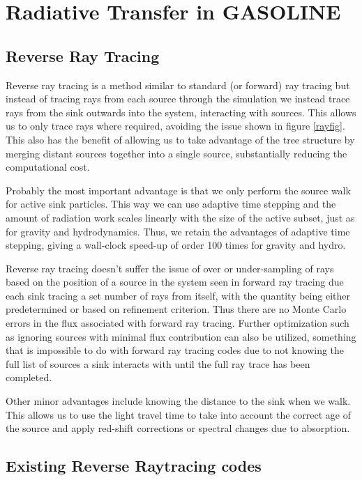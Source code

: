 \chapter{Radiative Transfer in GASOLINE}

\section{Reverse Ray Tracing}

Reverse ray tracing is a method similar to standard (or forward) ray tracing but instead of tracing rays from each source through the simulation we instead trace rays from the sink outwards into the system, interacting with sources. This allows us to only trace rays where required, avoiding the issue shown in figure \ref{rayfig}. This also has the benefit of allowing us to take advantage of the tree structure by merging distant sources together into a single source, substantially reducing the computational cost. 

Probably the most important advantage is that we only perform the source walk for active sink particles. This way we can use adaptive time stepping and the amount of radiation work scales linearly with the size of the active subset, just as for gravity and hydrodynamics. Thus, we retain the advantages of adaptive time stepping, giving a wall-clock speed-up of order 100 times for gravity and hydro.

Reverse ray tracing doesn't suffer the issue of over or under-sampling of rays based on the position of a source in the system seen in forward ray tracing due each sink tracing a set number of rays from itself, with the quantity being either predetermined or based on refinement criterion. Thus there are no Monte Carlo errors in the flux associated with forward ray tracing. Further optimization such as ignoring sources with minimal flux contribution can also be utilized, something that is impossible to do with forward ray tracing codes due to not knowing the full list of sources a sink interacts with until the full ray trace has been completed.

Other minor advantages include knowing the distance to the sink when we walk. This allows us to use the light travel time to take into account the correct age of the source and apply red-shift corrections or spectral changes due to absorption.

\section{Existing Reverse Raytracing codes}

